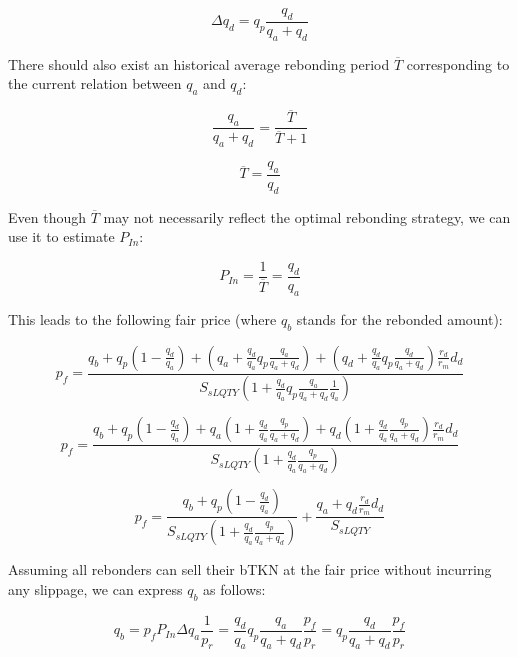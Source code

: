 \documentclass{article}
\begin{document}
\begin{equation}
\Delta q_{d} = q_{p} \frac{q_{d}}{q_{a}+q_{d}}
\end{equation}

There should also exist an historical average rebonding period $\overline{T}$ corresponding to the current relation between $q_a$ and $q_d$:

\begin{equation}
    \frac{q_{a}}{q_{a}+q_{d}} = \frac{\overline{T}}{\overline{T}+1}
\end{equation}

\begin{equation}
    \overline{T} = \frac{q_{a}}{q_{d}}
\end{equation}

Even though $\overline{T}$ may not necessarily reflect the optimal rebonding strategy, we can use it to estimate $P_{In}$:

\begin{equation}
   P_{In} = \frac{1}{\overline{T}} = \frac{q_{d}}{q_{a}}
\end{equation}

This leads to the following fair price (where $q_b$ stands for the rebonded amount):

\[
p_{f} = \frac{q_{b}+q_{p} \left(1-\frac{q_{d}}{q_{a}}\right)+\left(q_{a}+\frac{q_{d}}{q_{a}}q_{p}\frac{q_{a}}{q_{a}+q_{d}}\right)+ \left(q_{d}+\frac{q_{d}}{q_{a}}q_{p}\frac{q_{d}}{q_{a}+q_{d}}\right)\frac{r_{d}}{r_{m}}d_{d}}{S_{sLQTY} \left( 1+\frac{q_{d}}{q_{a}} q_{p}\frac{q_{a}}{q_{a}+q_{d}}\frac{1}{q_{a}} \right)}
\]

\[
p_{f} = \frac{q_{b}+q_{p} \left(1-\frac{q_{d}}{q_{a}}\right)+q_{a}\left(1+\frac{q_{d}}{q_{a}}\frac{q_{p}}{q_{a}+q_{d}}\right)+q_{d} \left(1+\frac{q_{d}}{q_{a}}\frac{q_{p}}{q_{a}+q_{d}}\right)\frac{r_{d}}{r_{m}}d_{d}}{S_{sLQTY} \left( 1+\frac{q_{d}}{q_{a}}\frac{q_{p}}{q_{a}+q_{d}} \right)}
\]

\begin{equation}
p_{f} = \frac{q_{b}+q_{p} \left(1-\frac{q_{d}}{q_{a}}\right)}{S_{sLQTY} \left( 1+\frac{q_{d}}{q_{a}}\frac{q_{p}}{q_{a}+q_{d}} \right)} + \frac{q_{a}+q_{d}\frac{r_{d}}{r_{m}}d_{d}}{S_{sLQTY}}
\end{equation}

Assuming all rebonders can sell their bTKN at the fair price without incurring any slippage, we can express $q_b$ as follows:

\begin{equation}
q_{b} = p_f P_{In} \Delta q_{a} \frac{1}{p_r} = \frac{q_{d}}{q_{a}} q_p \frac{q_{a}}{q_{a}+q_{d}} \frac{p_{f}}{p_{r}}  = q_p \frac{q_{d}}{q_{a}+q_{d}} \frac{p_{f}}{p_{r}}
\end{equation}
\end{document}
